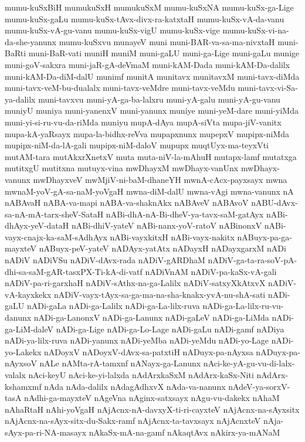{mumu-kuSxBiH
mumukuSxH
mumukuSxM
mumu-kuSxNA
mumu-kuSx-ga-Lige
mumu-kuSx-gaLu
mumu-kuSx-tAvx-divx-ra-katxtaH
mumu-kuSx-vA-da-vanu
mumu-kuSx-vA-gu-vanu
mumu-kuSx-vigU
mumu-kuSx-vige
mumu-kuSx-vi-na-da-she-yanunx
mumu-kuSxvu
munayeV
muni
muni-BAR-va-sa-ma-nivxtaH
muni-BaRti
muni-BaR-vati
muniH
muniM
muni-gaLU
muni-ga-Lige
muni-gaLu
munige
muni-goV-sakxra
muni-jaR-gA-deVmaM
muni-kAM-Dada
muni-kAM-Da-dalilx
muni-kAM-Da-diM-dalU
munimf
munitA
munitavx
munitavxM
muni-tavx-diMda
muni-tavx-veM-bu-dualalx
muni-tavx-veMdre
muni-tavx-veMdu
muni-tavx-vi-Sa-ya-dalilx
muni-tavxvu
muni-yA-ga-ba-lalxru
muni-yA-galu
muni-yA-gu-vanu
muniyU
muniya
muni-yanenxV
muni-yanunx
muniye
muni-yeM-dare
muni-yiMda
muni-yi-si-ru-vu-da-riMda
muniyu
mupA-dAya
mupA-siVta
mupa-jiV-vanitx
mupa-kA-yaRsayx
mupa-la-bidhx-reVva
mupapxnunx
mupepxV
mupipx-niMda
mupipx-niM-da-lA-gali
mupipx-niM-daloV
mupupx
muqtUyx-ma-teyxVti
mutAM-tara
mutAkxrXnetxV
muta
muta-niV-la-mAhuH
mutapx-lamf
mutatxga
mutitxgU
mutitxna
mutuyx-vina
mwDhayxM
mwDhayx-vanUnx
mwDhayx-vanunx
mwDhayxveV
mwMjiV-ni-baM-dhaneYH
mwnA-cAcx-payxsayx
mwna
mwnaM-yoV-gA-sa-naM-yoVgaH
mwna-diM-dalU
mwna-vAgi
mwna-vanunx
nA
nABAvaH
nABA-va-mapi
nABA-va-shaknAkx
nABAveV
nABAvoV
nABU-dAvx-sa-nA-mA-tarx-sheV-SataH
nABi-dhA-nA-Bi-dheV-ya-tavx-saM-gatAyx
nABi-dhAyx-yeV-dataH
nABi-dhiV-yateV
nABi-nanx-yoV-ratoV
nABinonxV
nABi-vayx-cnajx-ka-saM-sAdhAyx
nABi-vayxkitxH
nABi-vayx-nakitx
nABuyx-pa-ga-mayxteV
nABuyx-peV-yateV
nADAyx-yatAtx
nADayxH
nADayxgarxM
nADi
nADiV
nADiVSu
nADiV-dAvx-rada
nADiV-gARDhaM
nADiV-ga-ta-ra-soV-pA-dhi-sa-saM-gAR-tasxPX-Ti-kA-di-vatf
nADiVnAM
nADiV-pa-kaSx-vA-gali
nADiV-pa-ri-garxhaH
nADiV-sAthx-na-ga-Lalilx
nADiV-satxyXkAtxvX
nADiV-vA-kayxkekx
nADiV-vayx-tAyx-sa-ga-ma-na-sha-knakx-yvA-nu-shA-sati
nADi-gaLU
nADi-gaLa
nADi-ga-Lalilx
nADi-ga-La-lilx-ruva
nADi-ga-La-lilx-ru-vu-danunx
nADi-ga-LanonxV
nADi-ga-Lanunx
nADi-gaLeV
nADi-ga-LiMda
nADi-ga-LiM-daleV
nADi-ga-Lige
nADi-ga-Lo-Lage
nADi-gaLu
nADi-gamf
nADiya
nADi-ya-lilx-ruva
nADi-yanunx
nADi-yeMba
nADi-yeMdu
nADi-yo-Lage
nADi-yo-Lakekx
nADoyxV
nADoyxV-dAvx-sa-patxtiH
nADuyx-pa-nAyxsa
nADuyx-pa-nAyxsoV
nALe
nAMta-rA-tamxnf
nANayx-ga-Lanunx
nAci-ke-yA-gu-vu-di-lalx-valalx
nAci-keyU
nAci-ke-yi-lalxda
nAdArxkaSxM
nAdArx-kaSx-Niti
nAdArx-kshamxmf
nAda
nAda-dalilx
nAdagAdhxvX
nAda-va-nanunx
nAdeV-ya-sorxV-tasA
nAdhi-ga-mayxteV
nAgeVna
nAginx-satxsayx
nAgu-vu-dakekx
nAhaM
nAhaRtaH
nAhi-yoVgaH
nAjAcnx-nA-davxyX-ti-ri-cayxteV
nAjAcnx-na-sAyxsitx
nAjAcnx-na-sAyx-sitx-du-Sakx-ramf
nAjAcnx-ta-tavxsayx
nAjAcnxteV
nAja-sAyx-pa-ri-NA-masayx
nAkaSx-mA-na-gamf
nAkaqtAvx
nAkirx-ya-mANaM
}
